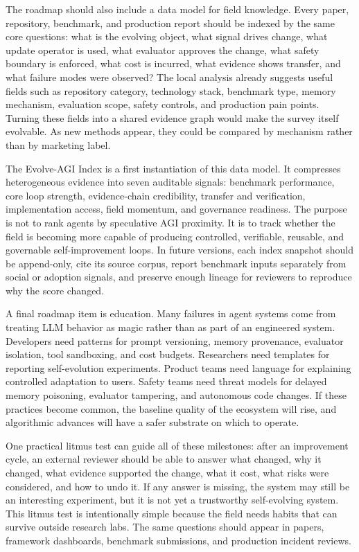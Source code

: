 The roadmap should also include a data model for field knowledge. Every paper, repository, benchmark, and production report should be indexed by the same core questions: what is the evolving object, what signal drives change, what update operator is used, what evaluator approves the change, what safety boundary is enforced, what cost is incurred, what evidence shows transfer, and what failure modes were observed? The local analysis already suggests useful fields such as repository category, technology stack, benchmark type, memory mechanism, evaluation scope, safety controls, and production pain points. Turning these fields into a shared evidence graph would make the survey itself evolvable. As new methods appear, they could be compared by mechanism rather than by marketing label.

The Evolve-AGI Index is a first instantiation of this data model. It compresses heterogeneous evidence into seven auditable signals: benchmark performance, core loop strength, evidence-chain credibility, transfer and verification, implementation access, field momentum, and governance readiness. The purpose is not to rank agents by speculative AGI proximity. It is to track whether the field is becoming more capable of producing controlled, verifiable, reusable, and governable self-improvement loops. In future versions, each index snapshot should be append-only, cite its source corpus, report benchmark inputs separately from social or adoption signals, and preserve enough lineage for reviewers to reproduce why the score changed.

A final roadmap item is education. Many failures in agent systems come from treating LLM behavior as magic rather than as part of an engineered system. Developers need patterns for prompt versioning, memory provenance, evaluator isolation, tool sandboxing, and cost budgets. Researchers need templates for reporting self-evolution experiments. Product teams need language for explaining controlled adaptation to users. Safety teams need threat models for delayed memory poisoning, evaluator tampering, and autonomous code changes. If these practices become common, the baseline quality of the ecosystem will rise, and algorithmic advances will have a safer substrate on which to operate.


One practical litmus test can guide all of these milestones: after an improvement cycle, an external reviewer should be able to answer what changed, why it changed, what evidence supported the change, what it cost, what risks were considered, and how to undo it. If any answer is missing, the system may still be an interesting experiment, but it is not yet a trustworthy self-evolving system. This litmus test is intentionally simple because the field needs habits that can survive outside research labs. The same questions should appear in papers, framework dashboards, benchmark submissions, and production incident reviews.

